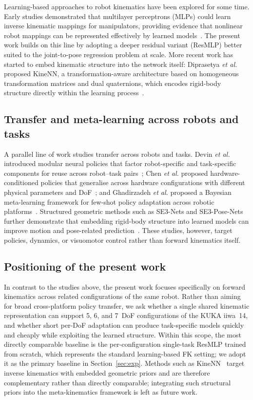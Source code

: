 \documentclass[conference]{IEEEtran}
\begin{document}
Learning-based approaches to robot kinematics have been explored for some time. Early studies demonstrated that multilayer perceptrons (MLPs) could learn inverse kinematic mappings for manipulators, providing evidence that nonlinear robot mappings can be represented effectively by learned models~\cite{duka2014,koker2004}. The present work builds on this line by adopting a deeper residual variant (ResMLP) better suited to the joint-to-pose regression problem at scale. More recent work has started to embed kinematic structure into the network itself: Diprasetya \emph{et al.} proposed KineNN, a transformation-aware architecture based on homogeneous transformation matrices and dual quaternions, which encodes rigid-body structure directly within the learning process~\cite{diprasetya2025}.

\subsection{Transfer and meta-learning across robots and tasks}
A parallel line of work studies transfer across robots and tasks. Devin \emph{et al.} introduced modular neural policies that factor robot-specific and task-specific components for reuse across robot--task pairs~\cite{devin2017}; Chen \emph{et al.} proposed hardware-conditioned policies that generalise across hardware configurations with different physical parameters and DoF~\cite{chen2018}; and Ghadirzadeh \emph{et al.} proposed a Bayesian meta-learning framework for few-shot policy adaptation across robotic platforms~\cite{ghadirzadeh2021}. Structured geometric methods such as SE3-Nets and SE3-Pose-Nets further demonstrate that embedding rigid-body structure into learned models can improve motion and pose-related prediction~\cite{byravan2017,byravan2018}. These studies, however, target policies, dynamics, or visuomotor control rather than forward kinematics itself.

\subsection{Positioning of the present work}
In contrast to the studies above, the present work focuses specifically on forward kinematics across related configurations of the same robot. Rather than aiming for broad cross-platform policy transfer, we ask whether a single shared kinematic representation can support 5, 6, and 7~DoF configurations of the KUKA iiwa~14, and whether short per-DoF adaptation can produce task-specific models quickly and cheaply while exploiting the learned structure. Within this scope, the most directly comparable baseline is the per-configuration single-task ResMLP trained from scratch, which represents the standard learning-based FK setting; we adopt it as the primary baseline in Section~\ref{sec:exp}. Methods such as KineNN~\cite{diprasetya2025} target inverse kinematics with embedded geometric priors and are therefore complementary rather than directly comparable; integrating such structural priors into the meta-kinematics framework is left as future work.
\end{document}
